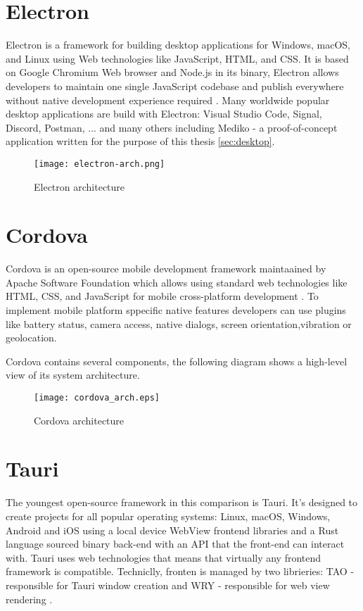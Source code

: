 \section{{Electron}}%
\label{sec:electron}
Electron is a framework for building desktop applications for Windows, macOS, and Linux using Web technologies like JavaScript, HTML, and CSS. It is based on Google Chromium Web browser and Node.js in its binary, Electron allows developers to maintain one single JavaScript codebase and publish everywhere without native development experience required \autocite{ElectronDoc}.
Many worldwide popular desktop applications are build with Electron: Visual Studio Code, Signal, Discord, Postman, ... and many others including Mediko - a proof-of-concept application written for the purpose of this thesis \ref{sec:desktop}.

\begin{figure}[H]
    \centering
    \texttt{[image: electron-arch.png]}
    \caption[Electron architecture]{\label{fig:electronarch} Electron architecture \autocite{ElectronArch} }
\end{figure}

\section{{Cordova}}
\label{sec:cordova}
Cordova is an open-source mobile development framework maintaained by Apache Software Foundation which allows using standard web technologies like HTML, CSS, and JavaScript for mobile cross-platform development \autocite{CordovaDoc}. To implement mobile platform sppecific native features developers can use plugins like battery status, camera access, native dialogs, screen orientation,vibration or geolocation.

Cordova contains several components, the following diagram shows a high-level view of its system architecture.

\begin{figure}[H]
    \centering
    \texttt{[image: cordova\_arch.eps]}
    \caption[Cordova architecture]{\label{fig:cordova} Cordova architecture }
\end{figure}


\section{{Tauri}}%
\label{sec:tauri}

The youngest open-source framework in this comparison is Tauri. It's designed to create projects for all popular operating systems: Linux, macOS, Windows, Android and iOS using a local device WebView \autocite{WebView} frontend libraries and a Rust language \autocite{RustWiki} sourced binary back-end with an API that the front-end can interact with. Tauri uses web technologies that means that virtually any frontend framework is compatible. Techniclly, fronten is managed by two librieries: TAO - responsible for Tauri window creation and WRY - responsible for web view rendering \autocite{TauriDoc}. 

